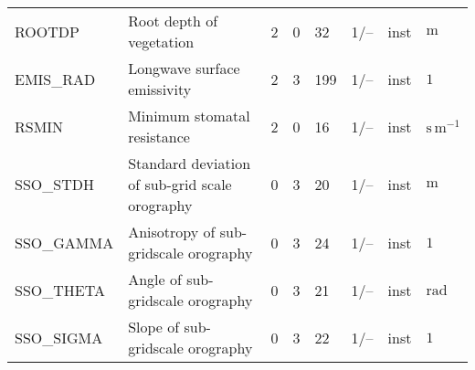 \begin{table}[H]
\begin{tabular}{p{2.0cm}p{5.0cm}p{0.7cm}p{0.7cm}p{0.7cm}p{1.4cm}p{1cm}p{1cm}}
ROOTDP                        &  Root depth of vegetation                                                               &               2                                   &                       0                     &                   32                       &                 1/--                            &                      inst                   &        $\mathrm{m}$ \\
EMIS\_RAD                     &  Longwave surface emissivity                                                            &               2                                   &                       3                     &                  199                       &                 1/--                            &                      inst                   &        $1$ \\
RSMIN                         &  Minimum stomatal resistance                                                            &               2                                   &                       0                     &                   16                       &                 1/--                            &                      inst                   &        $\mathrm{s\,m^{-1}}$ \\
SSO\_STDH                     &  Standard deviation of sub-grid scale orography                                         &               0                                   &                       3                     &                   20                       &                 1/--                            &                      inst                   &        $\mathrm{m}$ \\
SSO\_GAMMA                    &  Anisotropy of sub-gridscale orography                                                  &               0                                   &                       3                     &                   24                       &                 1/--                            &                      inst                   &        $1$ \\
SSO\_THETA                    &  Angle of sub-gridscale orography                                                       &               0                                   &                       3                     &                   21                       &                 1/--                            &                      inst                   &        $\mathrm{rad}$ \\
SSO\_SIGMA                    &  Slope of sub-gridscale orography                                                       &               0                                   &                       3                     &                   22                       &                 1/--                            &                      inst                   &        $1$ \\

\end{tabular}
\end{table}
